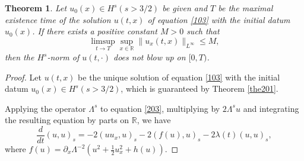 \documentclass[preprint,12pt]{elsarticle}
\numberwithin{equation}{section}
\newtheorem{theorem}{Theorem}[section]
\begin{document}
\begin{theorem}
\label{the203} Let $u_{0}(x)\in H^{s} (s>3/2)$ be given and
$T$ be the maximal existence time of the solution $u(t,x)$ of equation \eqref{103} with the initial datum $u_{0}(x)$.
If there exists a positive constant $M>0$ such that
\begin{equation*}
\limsup_{t\rightarrow T}\sup_{x\in\mathbb{R}}\|{u_{x}(t,x)}\|_{L^{\infty}}\leq M,
\end{equation*}
then the $H^{s}$-norm of $u(t,\cdot)$ does not blow up on $[0,T)$.
\end{theorem}
\begin{proof}
Let $u(t,x)$ be the unique solution of equation \eqref{103} with the initial datum $u_{0}(x)\in H^{s} (s>3/2)$, which is guaranteed by Theorem \ref{the201}.

Applying the operator $\Lambda^{s}$ to equation \eqref{203}, multiplying by $2\Lambda^{s} u$ and integrating the resulting equation by parts on $\mathbb{R}$, we have
\begin{equation}
\frac{d}{dt}(u,u)_{s}=-2(uu_{x},u)_{s}-2(f(u),u)_{s}-2\lambda(t)(u,u)_{s},
\label{208}
\end{equation}
where $f(u)=\partial_{x}\Lambda^{-2}\left(u^{2}+\frac{1}{2}u_{x}^{2}+h(u)\right).$


\end{proof}
\end{document}
